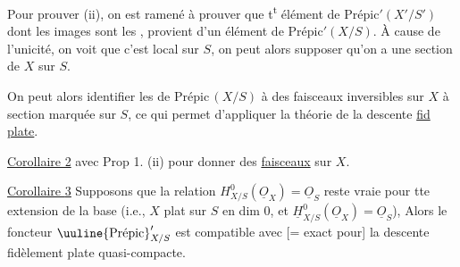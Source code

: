 
Pour prouver (ii), on est ramené à prouver que t\textsuperscript{t} élément de $\mathrm{Prépic}'(X'/S')$ dont les images sont les , provient d'un élément de $\mathrm{Prépic}'(X/S)$. À cause de l'unicité, on voit que c'est local sur $S$, on peut alors supposer qu'on a une section de $X$ sur $S$.

On peut alors identifier les  de $\mathrm{Prépic}\,(X/S)$ à des faisceaux inversibles  sur $X$ à section marquée sur $S$, ce qui permet d'appliquer la théorie de la descente \uline{fid plate}.

\uline{Corollaire 2}   avec Prop 1. (ii) pour donner des \uline{faisceaux} sur $X$.

\uline{Corollaire \uline{3}} Supposons que la relation $H^0_{X/S}(\underline O_X)=\underline O_S$ reste vraie pour tte extension de la base (i.e., $X$  plat sur $S$ en dim 0, et $\underline H^0_{X/S}(\underline O_X)=\underline O_S$),  Alors le foncteur $\text{\uuline{Prépic}}'_{X/S}$ est compatible avec [= exact pour]  la descente fidèlement plate quasi-compacte.

